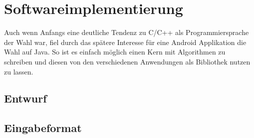 \section{Softwareimplementierung}
Auch wenn Anfangs eine deutliche Tendenz zu C/C++ als Programmiersprache der Wahl war, fiel durch das spätere Interesse für eine
Android Applikation die Wahl auf Java. So ist es einfach möglich einen Kern mit Algorithmen zu schreiben und diesen von den
verschiedenen Anwendungen als Bibliothek nutzen zu lassen.

\subsection{Entwurf}


\subsection{Eingabeformat}
